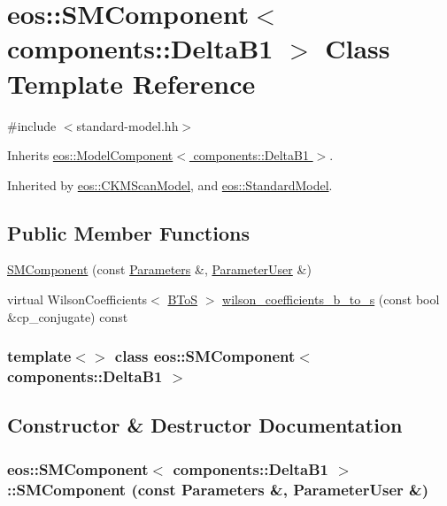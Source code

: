 \hypertarget{classeos_1_1SMComponent_3_01components_1_1DeltaB1_01_4}{
\section{eos::SMComponent$<$ components::DeltaB1 $>$ Class Template Reference}
\label{classeos_1_1SMComponent_3_01components_1_1DeltaB1_01_4}
}


{\ttfamily \#include $<$standard-\/model.hh$>$}

Inherits \hyperlink{classeos_1_1ModelComponent_3_01components_1_1DeltaB1_01_4}{eos::ModelComponent$<$ components::DeltaB1 $>$}.

Inherited by \hyperlink{classeos_1_1CKMScanModel}{eos::CKMScanModel}, and \hyperlink{classeos_1_1StandardModel}{eos::StandardModel}.\subsection*{Public Member Functions}
\begin{DoxyCompactItemize}
\item 
\hyperlink{classeos_1_1SMComponent_3_01components_1_1DeltaB1_01_4_ac58f05fb4a785c241cc62c6dd98b35cc}{SMComponent} (const \hyperlink{classeos_1_1Parameters}{Parameters} \&, \hyperlink{classeos_1_1ParameterUser}{ParameterUser} \&)
\item 
virtual WilsonCoefficients$<$ \hyperlink{structeos_1_1BToS}{BToS} $>$ \hyperlink{classeos_1_1SMComponent_3_01components_1_1DeltaB1_01_4_a4a3c9906daaf0be6c682245e0467a316}{wilson\_\-coefficients\_\-b\_\-to\_\-s} (const bool \&cp\_\-conjugate) const 
\end{DoxyCompactItemize}
\subsubsection*{template$<$$>$ class eos::SMComponent$<$ components::DeltaB1 $>$}



\subsection{Constructor \& Destructor Documentation}
\hypertarget{classeos_1_1SMComponent_3_01components_1_1DeltaB1_01_4_ac58f05fb4a785c241cc62c6dd98b35cc}{
\subsubsection[{SMComponent}]{\setlength{\rightskip}{0pt plus 5cm}eos::SMComponent$<$ components::DeltaB1 $>$::SMComponent (const {\bf Parameters} \&, \/  {\bf ParameterUser} \&)}}
\label{classeos_1_1SMComponent_3_01components_1_1DeltaB1_01_4_ac58f05fb4a785c241cc62c6dd98b35cc}



